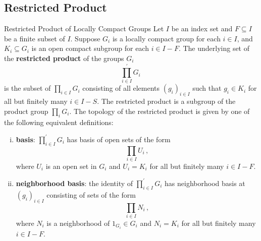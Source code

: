 \documentclass{report}
\begin{document}
\subsection{Restricted Product}
\begin{definition}{Restricted Product of Locally Compact Groups}{}
Let \( I \) be an index set and \( F\subseteq I \) be a finite subset of \( I \). Suppose \( G_i \) is a locally compact group for each \( i \in I \), and \( K_i \subseteq G_i \) is an open compact subgroup for each \( i \in I - F \). The underlying set of the \textbf{restricted product} of the groups \( G_i \)  
\[
\prod_{i\in I}^{\prime} G_i \,
\]
is the subset of $\prod_{i\in I} G_i$ consisting of all elements \( (g_i)_{i \in I} \) such that \( g_i \in K_i \) for all but finitely many \( i \in I - S \). The restricted product is a subgroup of the product group $\prod_i G_i$. The topology of the restricted product is given by one of the following equivalent definitions:
\begin{enumerate}[(i)]
	\item \textbf{basis}: $\prod_{i\in I}^{\prime} G_i$ has basis of open sets of the form
\[
\prod_{i\in I} U_i\,,
\]
where \( U_i \) is an open set in \( G_i \) and \( U_i = K_i \) for all but finitely many \( i \in I-F\).
\item \textbf{neighborhood basis}: the identity of $\prod_{i\in I}^{\prime} G_i$ has neighborhood basis at \( (g_i)_{i \in I} \) consisting of sets of the form
\[
\prod_{i\in I} N_i\,,
\]
where \( N_i \) is a neighborhood of \( 1_{G_i}\in G_i \) and \( N_i = K_i \) for all but finitely many \( i \in I-F\).
\end{enumerate}
\end{definition}
\end{document}

